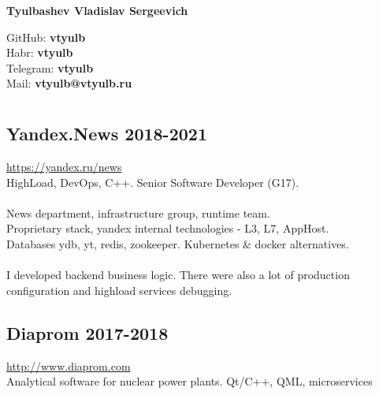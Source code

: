 \documentclass[a4paper, 12pt]{article}
\begin{document}
\begin{center}
    \huge\textbf{Tyulbashev Vladislav Sergeevich}\\
\end{center}
\null\hfill GitHub: \textbf{vtyulb} \\
\null\hfill Habr: \textbf{vtyulb} \\
\null\hfill Telegram: \textbf{vtyulb} \\
\null\hfill Mail: \textbf{vtyulb@vtyulb.ru} \\

\section*{} {
    \subsection*{Yandex.News 2018-2021} {
        \href{https://yandex.ru/news}{https://yandex.ru/news} \\
        HighLoad, DevOps, C++. Senior Software Developer (G17). \\ \\
        News department, infrastructure group, runtime team. \\
        Proprietary stack, yandex internal technologies - L3, L7, AppHost. \\
        Databases ydb, yt, redis, zookeeper. Kubernetes \& docker alternatives. \\ \\
        I developed backend business logic. There were also a lot of production \\
        configuration and highload services debugging.
    }
        
    \subsection*{Diaprom 2017-2018} {
        \href{http://www.diaprom.com/}{http://www.diaprom.com} \\
        Analytical software for nuclear power plants. Qt/C++, QML, microservices
    }
    
}
\end{document}

